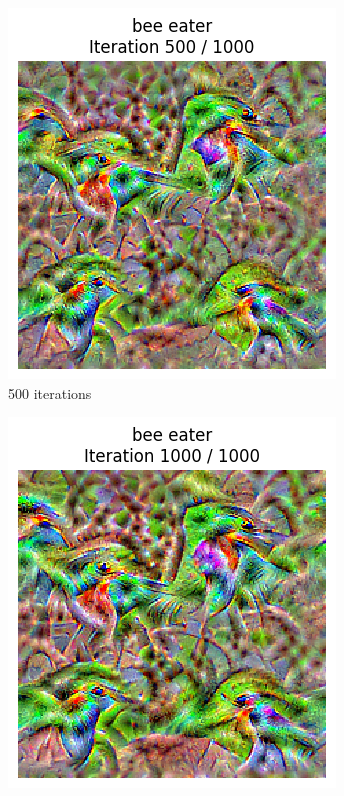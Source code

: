 \begin{figure}[H]
\begin{subfigure}[t]{.25\textwidth}
        \includegraphics[width=\linewidth]{figs/2b/SqueezeNet/SqueezeNet_bird_animated_1000_regpp_blur_500_frame.png}
        \caption{500 iterations}
        \label{fig:class_viz_iter:sub2}
    \end{subfigure}%
    \begin{subfigure}[t]{.25\textwidth}
        \centering
        \includegraphics[width=\linewidth]{figs/2b/SqueezeNet/SqueezeNet_bird_animated_1000_regpp_blur_last_frame.png}

\end{subfigure}
\end{figure}

